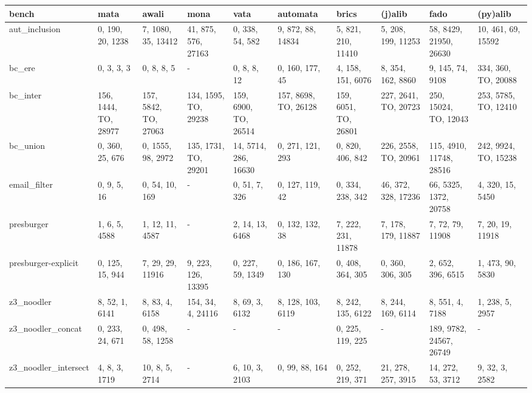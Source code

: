 \begin{tabular}{llllllllll}
\hline
 bench                & mata                 & awali                & mona                 & vata                 & automata             & brics                & (j)alib              & fado                    & (py)alib             \\
\hline
 aut\_inclusion        & 0, 190, 20, 1238     & 7, 1080, 35, 13412   & 41, 875, 576, 27163  & 0, 338, 54, 582      & 9, 872, 88, 14834    & 5, 821, 210, 11410   & 5, 208, 199, 11253   & 58, 8429, 21950, 26630  & 10, 461, 69, 15592   \\
 bc\_ere               & 0, 3, 3, 3           & 0, 8, 8, 5           & -                    & 0, 8, 8, 12          & 0, 160, 177, 45      & 4, 158, 151, 6076    & 8, 354, 162, 8860    & 9, 145, 74, 9108        & 334, 360, TO, 20088  \\
 bc\_inter             & 156, 1444, TO, 28977 & 157, 5842, TO, 27063 & 134, 1595, TO, 29238 & 159, 6900, TO, 26514 & 157, 8698, TO, 26128 & 159, 6051, TO, 26801 & 227, 2641, TO, 20723 & 250, 15024, TO, 12043   & 253, 5785, TO, 12410 \\
 bc\_union             & 0, 360, 25, 676      & 0, 1555, 98, 2972    & 135, 1731, TO, 29201 & 14, 5714, 286, 16630 & 0, 271, 121, 293     & 0, 820, 406, 842     & 226, 2558, TO, 20961 & 115, 4910, 11748, 28516 & 242, 9924, TO, 15238 \\
 email\_filter         & 0, 9, 5, 16          & 0, 54, 10, 169       & -                    & 0, 51, 7, 326        & 0, 127, 119, 42      & 0, 334, 238, 342     & 46, 372, 328, 17236  & 66, 5325, 1372, 20758   & 4, 320, 15, 5450     \\
 presburger           & 1, 6, 5, 4588        & 1, 12, 11, 4587      & -                    & 2, 14, 13, 6468      & 0, 132, 132, 38      & 7, 222, 231, 11878   & 7, 178, 179, 11887   & 7, 72, 79, 11908        & 7, 20, 19, 11918     \\
 presburger-explicit  & 0, 125, 15, 944      & 7, 29, 29, 11916     & 9, 223, 126, 13395   & 0, 227, 59, 1349     & 0, 186, 167, 130     & 0, 408, 364, 305     & 0, 360, 306, 305     & 2, 652, 396, 6515       & 1, 473, 90, 5830     \\
 z3\_noodler           & 8, 52, 1, 6141       & 8, 83, 4, 6158       & 154, 34, 4, 24116    & 8, 69, 3, 6132       & 8, 128, 103, 6119    & 8, 242, 135, 6122    & 8, 244, 169, 6114    & 8, 551, 4, 7188         & 1, 238, 5, 2957      \\
 z3\_noodler\_concat    & 0, 233, 24, 671      & 0, 498, 58, 1258     & -                    & -                    & -                    & 0, 225, 119, 225     & -                    & 189, 9782, 24567, 26749 & -                    \\
 z3\_noodler\_intersect & 4, 8, 3, 1719        & 10, 8, 5, 2714       & -                    & 6, 10, 3, 2103       & 0, 99, 88, 164       & 0, 252, 219, 371     & 21, 278, 257, 3915   & 14, 272, 53, 3712       & 9, 32, 3, 2582       \\
\hline
\end{tabular}